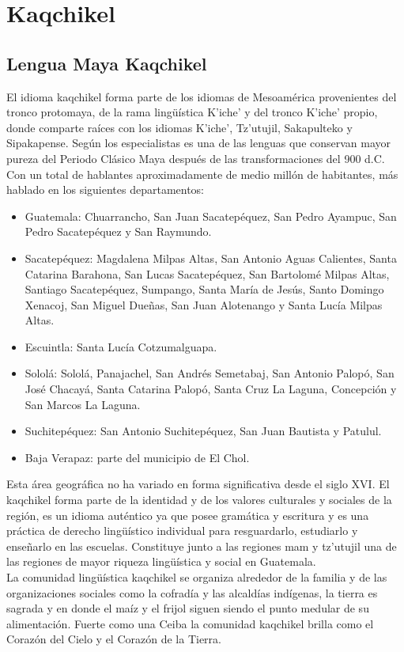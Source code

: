 \documentclass[a4paper,openright,11pt]{article}
\begin{document}
\section{Kaqchikel}
\subsection{Lengua Maya Kaqchikel}
El idioma kaqchikel forma parte de los idiomas de Mesoamérica provenientes del tronco protomaya, de la rama lingüística K’iche’ y del tronco K’iche’ propio, donde comparte raíces con los idiomas K’iche’, Tz’utujil, Sakapulteko y Sipakapense. Según los especialistas es una de las lenguas que conservan mayor pureza del Periodo Clásico Maya después de las transformaciones del 900 d.C. Con un total de hablantes aproximadamente de medio millón de habitantes, más hablado en los siguientes departamentos:
\begin{itemize}
	\item Guatemala: Chuarrancho, San Juan Sacatepéquez, San Pedro Ayampuc, San Pedro Sacatepéquez y San Raymundo.
	\item Sacatepéquez: Magdalena Milpas Altas, San Antonio Aguas Calientes, Santa Catarina Barahona, San Lucas Sacatepéquez, San Bartolomé Milpas Altas, Santiago Sacatepéquez, Sumpango, Santa María de Jesús, Santo Domingo Xenacoj, San Miguel Dueñas, San Juan Alotenango y Santa Lucía Milpas Altas.
	\item Escuintla: Santa Lucía Cotzumalguapa.
	\item Sololá: Sololá, Panajachel, San Andrés Semetabaj, San Antonio Palopó, San José Chacayá, Santa Catarina Palopó, Santa Cruz La Laguna, Concepción y San Marcos La Laguna.
	\item Suchitepéquez: San Antonio Suchitepéquez, San Juan Bautista y Patulul.
	\item Baja Verapaz: parte del municipio de El Chol.
\end{itemize}
Esta área geográfica no ha variado en forma significativa desde el siglo XVI. El kaqchikel  forma parte de la identidad y de los valores culturales y sociales de la región, es un idioma auténtico ya que posee gramática y escritura y es una práctica de derecho lingüístico individual para resguardarlo, estudiarlo y enseñarlo en las escuelas. Constituye junto a las regiones mam y tz’utujil una de las regiones de mayor riqueza lingüística y social en Guatemala. \\

La comunidad lingüística kaqchikel se organiza alrededor de la familia y de las organizaciones sociales como la cofradía y las alcaldías indígenas, la tierra es sagrada y en donde el maíz y el frijol siguen siendo el punto medular de su alimentación. Fuerte como una Ceiba la comunidad kaqchikel brilla como el Corazón del Cielo y el Corazón de la Tierra.\\ 
\end{document}
